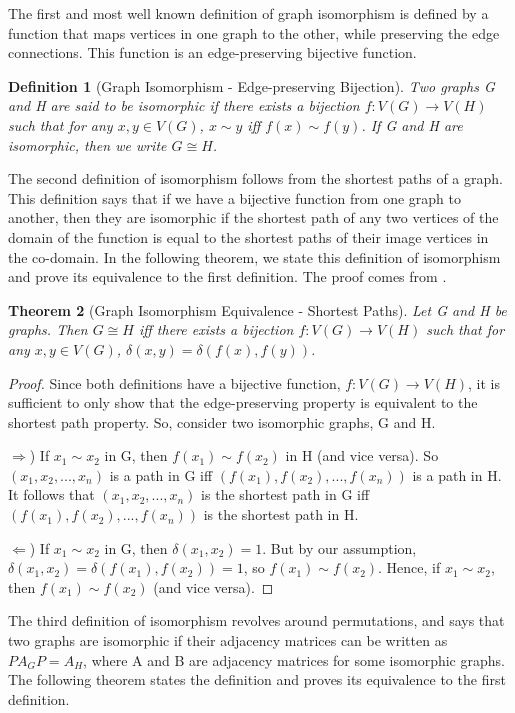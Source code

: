 \documentclass[12pt]{article}
\newtheorem{thm}{Theorem}[section]
\newtheorem{defn}[thm]{Definition}
\begin{document}
The first and most well known definition of graph isomorphism is defined by a function that maps vertices in one graph to the other, while preserving the edge connections. This function is an edge-preserving bijective function.
\begin{defn}[Graph Isomorphism - Edge-preserving Bijection]
Two graphs G and H are said to be \textit{isomorphic} if there exists a bijection $f:V(G) \to V(H)$ such that for any $x, y \in V(G)$, $x \sim y$ iff $f(x) \sim f(y)$. If G and H are isomorphic, then we write $G \cong H$.
\end{defn}

The second definition of isomorphism follows from the shortest paths of a graph. This definition says that if we have a bijective function from one graph to another, then they are isomorphic if the shortest path of any two vertices of the domain of the function is equal to the shortest paths of their image vertices in the co-domain. In the following theorem, we state this definition of isomorphism and prove its equivalence to the first definition. The proof comes from \cite{shortest}.

\begin{thm}[Graph Isomorphism Equivalence - Shortest Paths]
\label{shortest}
Let G and H be graphs. Then $G \cong H$ iff there exists a bijection $f:V(G) \to V(H)$ such that for any $x, y \in V(G)$, $\delta(x, y) = \delta(f(x), f(y))$.
\end{thm}

\begin{proof}
Since both definitions have a bijective function, $f:V(G) \to V(H)$, it is sufficient to only show that the edge-preserving property is equivalent to the shortest path property. So, consider two isomorphic graphs, G and H.

$\Rightarrow$) If $x_1 \sim x_2$ in G, then $f(x_1) \sim f(x_2)$ in H (and vice versa). So $(x_1, x_2, ..., x_n)$ is a path in G iff $(f(x_1), f(x_2), ..., f(x_n))$ is a path in H. It follows that $(x_1, x_2, ..., x_n)$ is the shortest path in G iff $(f(x_1), f(x_2), ..., f(x_n))$ is the shortest path in H.

$\Leftarrow$) If $x_1 \sim x_2$ in G, then $\delta(x_1, x_2) = 1$. But by our assumption, $\delta(x_1, x_2) = \delta(f(x_1), f(x_2)) = 1$, so $f(x_1) \sim f(x_2)$. Hence, if $x_1 \sim x_2$, then $f(x_1) \sim f(x_2)$ (and vice versa).
\end{proof}

The third definition of isomorphism revolves around permutations, and says that two graphs are isomorphic if their adjacency matrices can be written as $PA_GP = A_H$, where A and B are adjacency matrices for some isomorphic graphs. The following theorem states the definition and proves its equivalence to the first definition.
\end{document}
